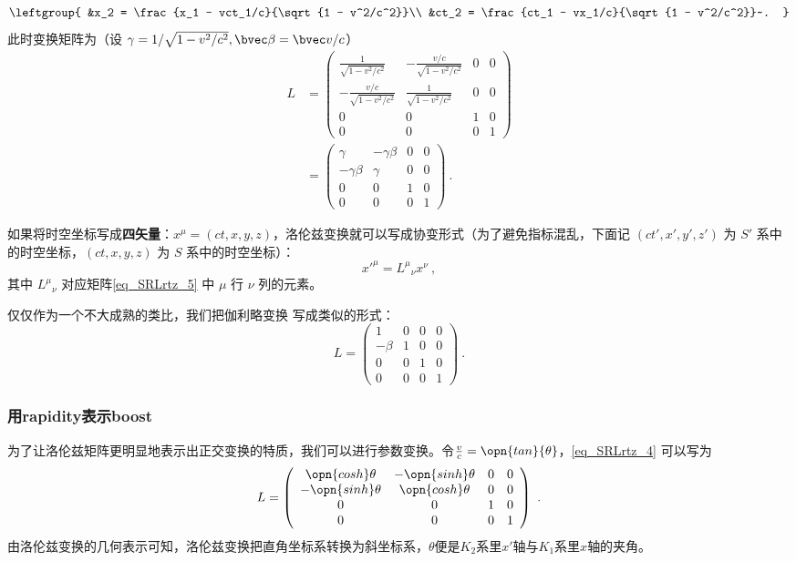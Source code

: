 \begin{equation}
\leftgroup{
&x_2 = \frac{x_1 - vct_1/c}{\sqrt{1 - v^2/c^2}}\\
&ct_2 = \frac{ct_1 - vx_1/c}{\sqrt{1 - v^2/c^2}}~.
}
\end{equation}
此时变换矩阵为（设 $\gamma=1/\sqrt{1-v^2/c^2},\bvec \beta=\bvec v/c$）
\begin{equation}\label{eq_SRLrtz_5}
\begin{aligned}
L&=
\left(\begin{matrix}
\frac{1}{\sqrt{1-v^2/c^2}}& -\frac{v/c}{\sqrt{1-v^2/c^2}}& 0& 0\\
-\frac{v/c}{\sqrt{1-v^2/c^2}}& \frac{1}{\sqrt{1-v^2/c^2}}& 0& 0\\
0&0&1&0\\
0&0&0&1
\end{matrix}\right)\\
&=
\left(\begin{matrix}
\gamma& -\gamma\beta& 0& 0\\
-\gamma\beta& \gamma& 0& 0\\
0&0&1&0\\
0&0&0&1
\end{matrix}\right)~.
\end{aligned}
\end{equation}

如果将时空坐标写成\textbf{四矢量}：$x^{\mu}=(ct,x,y,z)$，洛伦兹变换就可以写成协变形式（为了避免指标混乱，下面记 $(ct',x',y',z')$ 为 $S'$ 系中的时空坐标，$(ct,x,y,z)$ 为 $S$ 系中的时空坐标）：
\begin{equation}
x'^{\mu}={L^\mu}_\nu x^\nu~,
\end{equation}
其中 ${L^\mu}_\nu$ 对应矩阵\autoref{eq_SRLrtz_5} 中 $\mu$ 行 $\nu$ 列的元素。

仅仅作为一个不大成熟的类比，我们把伽利略变换 写成类似的形式：
$$
L=\left(\begin{matrix}
1& 0& 0& 0\\
-\beta& 1& 0& 0\\
0&0&1&0\\
0&0&0&1
\end{matrix}\right)~.
$$
\subsubsection{用rapidity表示boost}
为了让洛伦兹矩阵更明显地表示出正交变换的特质，我们可以进行参数变换。令$\frac{v}{c}=\opn{tan}{\theta}$，\autoref{eq_SRLrtz_4} 可以写为
\begin{equation}
L=\left(\begin{array}{cccc}\opn{cosh}\theta & -\opn{sinh}\theta & 0 & 0 \\ -\opn{sinh}\theta & \opn{cosh}\theta & 0 & 0 \\ 0 & 0 & 1 & 0 \\ 0 & 0 & 0 & 1\end{array}\right)
~.\end{equation}
由洛伦兹变换的几何表示可知，洛伦兹变换把直角坐标系转换为斜坐标系，$\theta$便是$K_2$系里$x'$轴与$K_1$系里$x$轴的夹角。

